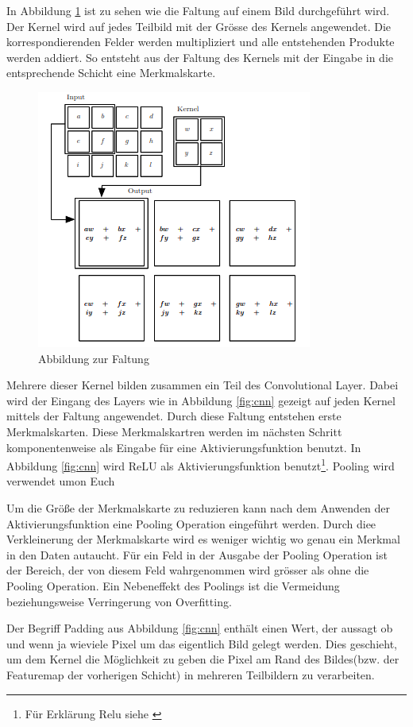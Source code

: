In Abbildung \ref{fig:faltung} ist zu sehen wie die Faltung auf einem Bild durchgeführt wird. Der Kernel wird auf jedes Teilbild mit der Grösse des Kernels angewendet. Die korrespondierenden Felder werden multipliziert und alle entstehenden Produkte werden addiert. So entsteht aus der Faltung des Kernels mit der Eingabe in die entsprechende Schicht eine Merkmalskarte.
\begin{figure}[H]
 \centering
 \includegraphics[width=0.45 \textwidth,keepaspectratio=true]{images/convolution.png}
 \caption{Abbildung zur Faltung \cite{CNNBook}}
 \label{fig:faltung}
\end{figure}
Mehrere dieser Kernel bilden zusammen ein Teil des Convolutional Layer. Dabei wird der Eingang des Layers wie in Abbildung \ref{fig:cnn} gezeigt auf jeden Kernel mittels der Faltung angewendet. Durch diese Faltung entstehen erste Merkmalskarten. Diese Merkmalskartren werden im nächsten Schritt komponentenweise als Eingabe für eine Aktivierungsfunktion benutzt. In Abbildung \ref{fig:cnn} wird ReLU als Aktivierungsfunktion benutzt\footnote{Für Erklärung Relu siehe \cite{neural}}. Pooling wird verwendet umon Euch

Um die Größe der Merkmalskarte zu reduzieren kann nach dem Anwenden der Aktivierungsfunktion eine Pooling Operation eingeführt werden. Durch diee Verkleinerung der Merkmalskarte wird es weniger wichtig wo genau ein Merkmal in den Daten autaucht. Für ein Feld in der Ausgabe der Pooling Operation ist der Bereich, der von diesem Feld wahrgenommen wird grösser als ohne die Pooling Operation. Ein Nebeneffekt des Poolings ist die Vermeidung beziehungsweise Verringerung von Overfitting. 


Der Begriff Padding aus Abbildung \ref{fig:cnn} enthält einen Wert, der aussagt ob und wenn ja wieviele Pixel um das eigentlich Bild gelegt werden. Dies geschieht, um dem Kernel die Möglichkeit zu geben die Pixel am Rand des Bildes(bzw. der Featuremap der vorherigen Schicht) in mehreren Teilbildern zu verarbeiten.



